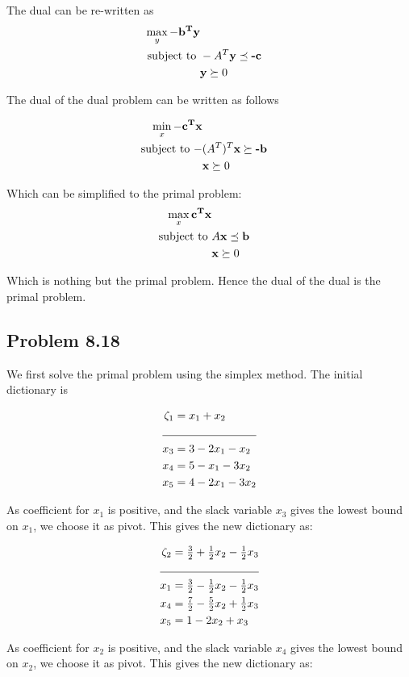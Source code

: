 \documentclass[letterpaper,12pt]{article}
\theoremstyle{definition}
\begin{document}
The dual can be re-written as
\begin{align*}
\max_{{y}} \mathbf{-b^Ty} \\
\textnormal{subject to } &-A^T\textbf{y}\preceq \textbf{-c}\\
&\textbf{y} \succeq 0\\
\end{align*}

The dual of the dual problem can be written as follows

\begin{align*}
\min_{{x}} \mathbf{-c^Tx} \\
\textnormal{subject to } -&(A^T)^T\textbf{x} \succeq \textbf{-b}\\
&\textbf{x} \succeq 0\\
\end{align*}

Which can be simplified to the primal problem:
\begin{align*}
\max_{{x}} \mathbf{c^Tx} \\
\textnormal{subject to } &A\textbf{x}\preceq \textbf{b}\\
&\textbf{x} \succeq 0\\
\end{align*}

Which is nothing but the primal problem. Hence the dual of the dual is the primal problem.

\subsection*{Problem 8.18}
We first solve the primal problem using the simplex method. The initial dictionary is

\begin{align*}
  \zeta_1 &= x_1+x_2\\
  \cline{1-2}
  x_3 &= 3-2x_1-x_2\\
  x_4 &= 5-x_1-3x_2\\
  x_5 &= 4-2x_1-3x_2\\
\end{align*}
\begin{flushleft}
As coefficient for $x_1$ is positive, and  the slack variable $x_3$ gives the lowest bound on $x_1$, we choose it as pivot. This gives the new dictionary as:
\end{flushleft}

\begin{align*}
  \zeta_2 &= \tfrac{3}{2} + \tfrac{1}{2}x_2-\tfrac{1}{2}x_3\\
  \cline{1-2}
  x_1 &= \tfrac{3}{2} -\tfrac{1}{2}x_2-\tfrac{1}{2}x_3\\
  x_4 &= \tfrac{7}{2}-\tfrac{5}{2}x_2+\tfrac{1}{2}x_3\\
  x_5 &= 1-2x_2+x_3\\
\end{align*}
\begin{flushleft}
As coefficient for $x_2$ is positive, and  the slack variable $x_4$ gives the lowest bound on $x_2$, we choose it as pivot. This gives the new dictionary as:
\end{flushleft}
\end{document}
